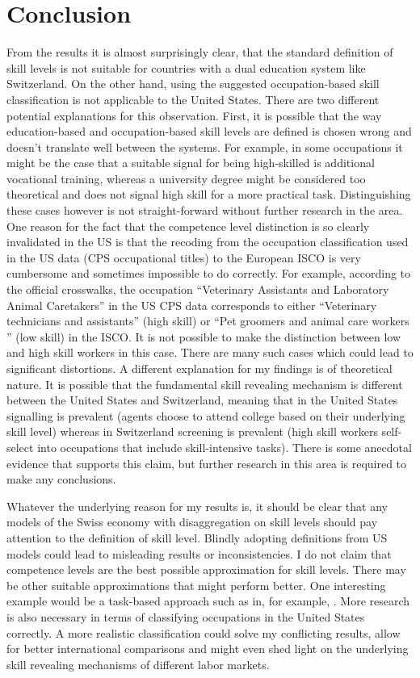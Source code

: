 \documentclass[]{article}
\begin{document}
\section{Conclusion}
From the results it is almost surprisingly clear, that the standard
definition of skill levels is not suitable for countries with a dual
education system like Switzerland. On the other hand, using the
suggested occupation-based skill classification is not applicable to
the United States. There are two different potential explanations for
this observation. First, it is possible that the way education-based
and occupation-based skill levels are defined is chosen wrong and
doesn't translate well between the systems. For example, in some
occupations it might be the case that a suitable signal for being
high-skilled is additional vocational training, whereas a university
degree might be considered too theoretical and does not signal high
skill for a more practical task. Distinguishing these cases however is
not straight-forward without further research in the area. One reason
for the fact that the competence level distinction is so clearly
invalidated in the US is that the recoding from the occupation
classification used in the US data (CPS occupational titles) to the
European ISCO is very cumbersome and sometimes impossible to do
correctly. For example, according to the official crosswalks, the
occupation ``Veterinary Assistants and Laboratory Animal Caretakers''
in the US CPS data corresponds to either ``Veterinary technicians and
assistants'' (high skill) or ``Pet groomers and animal care workers ''
(low skill) in the ISCO. It is not possible to make the distinction
between low and high skill workers in this case. There are many such
cases which could lead to significant distortions. A different
explanation for my findings is of theoretical nature. It is possible
that the fundamental skill revealing mechanism is different between
the United States and Switzerland, meaning that in the United States
signalling is prevalent (agents choose to attend college based on
their underlying skill level) whereas in Switzerland screening is
prevalent (high skill workers self-select into occupations that
include skill-intensive tasks). There is some anecdotal evidence that
supports this claim, but further research in this area is required to
make any conclusions.

Whatever the underlying reason for my results is, it should be clear
that any models of the Swiss economy with disaggregation on skill
levels should pay attention to the definition of skill level. Blindly
adopting definitions from US models could lead to misleading results
or inconsistencies. I do not claim that competence levels are the best
possible approximation for skill levels. There may be other suitable
approximations that might perform better. One interesting example
would be a task-based approach such as in, for example,
\cite{SpitzOener.2006}. More research is also necessary in terms of
classifying occupations in the United States correctly. A more
realistic classification could solve my conflicting results, allow for
better international comparisons and might even shed light on the
underlying skill revealing mechanisms of different labor markets.
\end{document}
